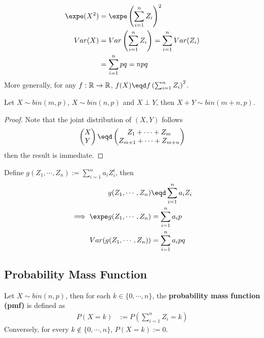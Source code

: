 \documentclass{article}
\begin{document}
   	\begin{corollary}
   		\begin{align}
   			\expe (X^2) &= \expe \left ( \sum_{i=1}^n Z_i \right)^2 \\
   			Var(X) &= Var \left( \sum_{i=1}^n Z_i \right)
   			= \sum_{i=1}^n Var(Z_i) \\
   			&= \sum_{i=1}^n pq
   			= npq
   		\end{align}
   		More generally, for any $f: \mathbb{R} \to \mathbb{R}$, $f(X) \eqd f \left( \sum_{i=1}^n Z_i \right)^2$.
   	\end{corollary}
   	
   	\begin{proposition}
   		Let $X \sim bin (m, p)$, $X \sim bin(n, p)$ and $X \perp Y$, then $X + Y \sim bin(m + n, p)$.
   	\end{proposition}
   	
   	\begin{proof}
   		Note that the joint distribution of $(X, Y)$ follows 
   		\begin{align}
   			\begin{pmatrix}
   				X \\ Y
   			\end{pmatrix}
   			\eqd
   			\begin{pmatrix}
   				Z_1 + \cdots + Z_m \\
   				Z_{m+1} + \cdots + Z_{m+n}
   			\end{pmatrix}
   		\end{align}
		then the result is immediate.
   	\end{proof}
   	
   	\begin{example}
   		Define $g(Z_1, \cdots, Z_n) := \sum_{i=1}^n a_i Z_i^i$, then 
   		\begin{align}
   			g(Z_1, \cdots, Z_n) &\eqd \sum_{i=1}^n a_i Z_i \\
   			\implies \expe g(Z_1, \cdots, Z_n) &= \sum_{i=1}^n a_i p \\
   			Var(g(Z_1, \cdots, Z_n)) &= \sum_{i=1}^n a_i pq
   		\end{align}
   	\end{example}
   	
   	\subsection{Probability Mass Function}
   	\begin{definition}
   		Let $X \sim bin(n, p)$, then for each $k \in \{0, \cdots, n\}$, the \textbf{probability mass function (pmf)} is defined as
   		\begin{align}
   			P(X = k) &:= P(\sum_{i=1}^n Z_i = k)
   		\end{align}
   		Conversely, for every $k \notin \{0, \cdots, n\}$, $P(X=k) := 0$.
   	\end{definition}
   	
\end{document}
